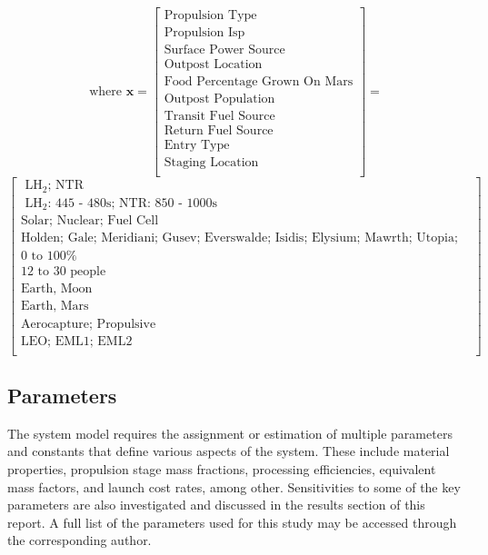 \documentclass[]{aiaa-pretty}
\begin{document}
\begin{equation*}
\mbox{where } \mathbf{x}
=
\begin{bmatrix}
\mbox{Propulsion Type}\\
\mbox{Propulsion Isp}\\
\mbox{Surface Power Source}\\
\mbox{Outpost Location}\\
\mbox{Food Percentage Grown On Mars}\\
\mbox{Outpost Population}\\
\mbox{Transit Fuel Source}\\
\mbox{Return Fuel Source}\\
\mbox{Entry Type}\\
\mbox{Staging Location}\\
\end{bmatrix}
=
\end{equation*}
\begin{equation*}
\begin{bmatrix}
\mbox{ LH$_2$; NTR}\\
\mbox{ LH$_2$: 445 - 480s; NTR: 850 - 1000s}\\
\mbox{Solar; Nuclear; Fuel Cell}\\
\mbox{Holden; Gale; Meridiani; Gusev; Everswalde; Isidis; Elysium; Mawrth; Utopia; Planus Boreum; Hellas; Amazonis}\\
\mbox{0 to 100\%}\\
\mbox{12 to 30 people}\\
\mbox{Earth, Moon}\\
\mbox{Earth, Mars}\\
\mbox{Aerocapture; Propulsive}\\
\mbox{LEO; EML1; EML2}\\
\end{bmatrix}
\end{equation*}

\subsection{Parameters}
\label{sec:params}
The system model requires the assignment or estimation of multiple parameters and constants that define various aspects of the system. These include material properties, propulsion stage mass fractions, processing efficiencies, equivalent mass factors, and launch cost rates, among other. Sensitivities to some of the key parameters are also investigated and discussed in the results section of this report. A full list of the parameters used for this study may be accessed through the corresponding author. 
\end{document}
